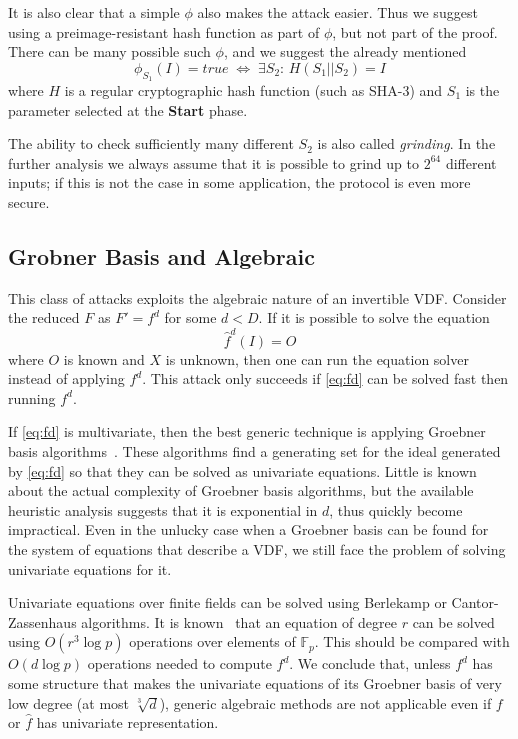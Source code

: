 \documentclass{article}
\begin{document}
 It is also clear that a simple $\phi$ also makes the attack easier. Thus we suggest using a preimage-resistant hash function as part of $\phi$, but not part of the proof. There can be many possible such $\phi$, and we suggest the already mentioned 
\begin{equation}
    \label{eq:phi}
    \phi_{S_1}(I) = true\;\Leftrightarrow\; \exists S_2:\,H(S_1||S_2)=I
\end{equation}
where $H$ is a regular cryptographic hash function (such as SHA-3) and $S_1$ is the parameter selected at the \textbf{Start} phase.

The ability to check sufficiently many different $S_2$ is also called \emph{grinding}. In the further analysis we always assume that it is possible to grind up to $2^{64}$ different inputs; if this is not the case in some application, the protocol is even more secure. 
 


\subsection{Grobner Basis and Algebraic}
This class of attacks exploits the algebraic nature of an invertible VDF.
Consider the reduced  $F$ as $F' = f^d$ for some $d<D$. If it is possible to solve the equation
\begin{equation}\label{eq:fd}
\widehat{f}^d(I) = O
\end{equation}
where $O$ is known and $X$ is unknown, then one can run the equation solver instead of applying $f^d$. This attack only succeeds if \eqref{eq:fd} can be solved fast then running $f^d$. 

If \eqref{eq:fd} is multivariate, then the best generic technique is applying Groebner basis algorithms~\cite{DBLP:books/daglib/0091062,faugere2002new}. These algorithms find a generating set for the ideal generated by \eqref{eq:fd} so that they can be solved as univariate equations. Little is known about the actual complexity of Groebner basis algorithms, but the available heuristic analysis suggests that it is exponential in $d$, thus quickly become impractical. Even in the unlucky case when a Groebner basis can be found for the system of equations that describe a VDF, we still face the problem of solving univariate equations for it.

Univariate equations over finite fields can be solved using Berlekamp or  Cantor-Zassenhaus algorithms. It is known~\cite{cantor1981new} that an equation of degree $r$ can be solved using $O(r^3\log p )$ operations over elements of $\mathbb{F}_p$. This should be compared with $O(d\log p)$  operations needed to compute $f^d$. We conclude that, unless $f^d$ has some structure that makes the univariate equations of its Groebner basis of very low degree (at most $\sqrt[3]{d}$), generic algebraic methods are not applicable even if $f$ or $\widehat{f}$ has univariate representation.
\end{document}

